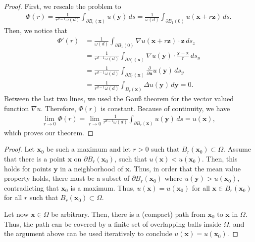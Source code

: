\begin{proof}
  First, we rescale the problem to
  \begin{gather*}
    \Phi(r) = \frac1{r^{d-1}\omega(d)}
    \int_{\partial B_r(\mathbf x)} u(\mathbf y) \,ds
    = \frac1{\omega(d)} \int_{\partial B_1(0)} u(\mathbf x+r\mathbf z) \,ds.
  \end{gather*}
  Then, we notice that
  \begin{align*}
    \Phi'(r)
    &= \frac1{\omega(d)} \int_{\partial B_1(0)}
      \nabla u(\mathbf x+r\mathbf z)\cdot \mathbf z \,ds_z\\
    &= \frac1{r^{d-1}\omega(d)} \int_{\partial B_r(\mathbf x)}
      \nabla u(\mathbf y)\cdot\frac{\mathbf y-\mathbf x}{r} \,ds_y\\
    &= \frac1{r^{d-1}\omega(d)} \int_{\partial B_r(\mathbf x)}
    \frac{\partial}{\partial \mathbf n} u(\mathbf y) \,ds_y\\
    &= \frac1{r^{d-1}\omega(d)} \int_{B_r(\mathbf x)}
    \Delta u(\mathbf y)\,d\mathbf y = 0.
  \end{align*}
  Between the last two lines, we used the Gauß theorem for the vector
  valued function $\nabla u$. Therefore, $\Phi(r)$ is
  constant. Because of continuity, we have
  \begin{gather*}
    \lim_{r\to 0} \Phi(r) =
    \lim_{r\to 0}\frac1{r^{d-1}\omega(d)} \int_{\partial B_r(\mathbf x)} u(\mathbf y)
    \,ds
    = u(\mathbf x),
  \end{gather*}
  which proves our theorem.
\end{proof}



\begin{proof}
  Let $\mathbf x_0$ be such a maximum and let $r>0$ such that
  $B_r(\mathbf x_0) \subset \Omega$. Assume that there is a point
  $\mathbf x$ on $\partial B_r(\mathbf x_0)$, such that $u(\mathbf x)
  < u(\mathbf x_0)$. Then, this holds for points $\mathbf y$ in a
  neighborhood of $\mathbf x$. Thus, in order that the mean value
  property holds, there must be a subset of $\partial B_r(\mathbf
  x_0)$ where $u(\mathbf y) > u(\mathbf x_0)$, contradicting that
  $\mathbf x_0$ is a maximum. Thus, $u(\mathbf x) = u(\mathbf x_0)$
  for all $\mathbf x \in B_r(\mathbf x_0)$ for all $r$ such that
  $B_r(\mathbf x_0) \subset \Omega$.

  Let now $\mathbf x\in \Omega$ be arbitrary. Then, there is a
  (compact) path from $\mathbf x_0$ to $\mathbf x$ in $\Omega$. Thus,
  the path can be covered by a finite set of overlapping balls inside
  $\Omega$, and the argument above can be used iteratively to conclude
  $u(\mathbf x) = u(\mathbf x_0)$.
\end{proof}


